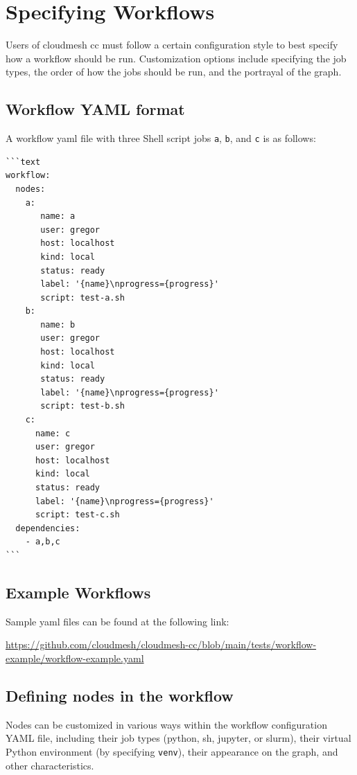\section{Specifying Workflows}\label{specifying-workflows}

Users of cloudmesh cc must follow a certain configuration style to best
specify how a workflow should be run. Customization options include
specifying the job types, the order of how the jobs should be run, and
the portrayal of the graph.

\subsection{Workflow YAML format}\label{workflow-yaml-format}

A workflow yaml file with three Shell script jobs \texttt{a},
\texttt{b}, and \texttt{c} is as follows:

\begin{verbatim}
```text
workflow:
  nodes:
    a:
       name: a
       user: gregor
       host: localhost
       kind: local
       status: ready
       label: '{name}\nprogress={progress}'
       script: test-a.sh
    b:
       name: b
       user: gregor
       host: localhost
       kind: local
       status: ready
       label: '{name}\nprogress={progress}'
       script: test-b.sh
    c:
      name: c
      user: gregor
      host: localhost
      kind: local
      status: ready
      label: '{name}\nprogress={progress}'
      script: test-c.sh
  dependencies:
    - a,b,c
```
\end{verbatim}

\subsection{Example Workflows}\label{example-workflows}

Sample yaml files can be found at the following link:

\url{https://github.com/cloudmesh/cloudmesh-cc/blob/main/tests/workflow-example/workflow-example.yaml}

\subsection{Defining nodes in the
workflow}\label{defining-nodes-in-the-workflow}

Nodes can be customized in various ways within the workflow
configuration YAML file, including their job types (python, sh, jupyter,
or slurm), their virtual Python environment (by specifying
\texttt{venv}), their appearance on the graph, and other
characteristics.

